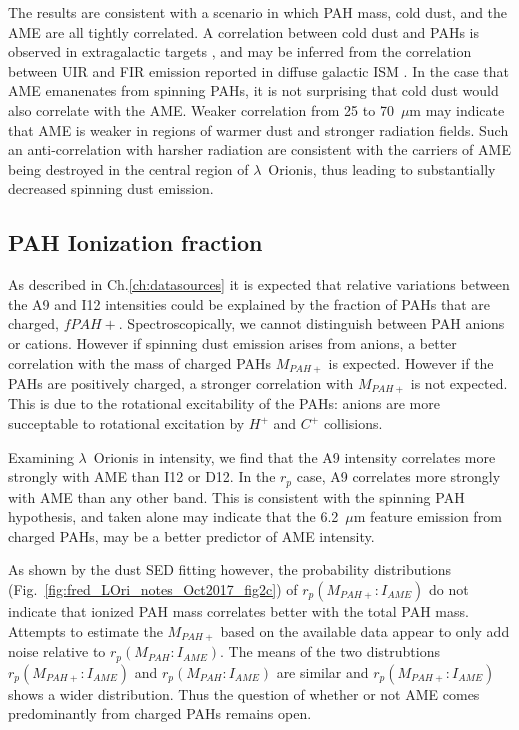         The results are consistent with a scenario in which PAH mass, cold dust, and the AME are all tightly correlated. A correlation between cold dust and PAHs is observed in extragalactic targets \citep{haas02}, and may be inferred from the correlation between UIR and FIR emission reported in diffuse galactic ISM \citep{onaka96}. In the case that AME emanenates from spinning PAHs, it is not surprising that cold dust would also correlate with the AME. Weaker correlation from 25 to 70~$\mu$m may indicate that AME is weaker in regions of warmer dust and stronger radiation fields. Such an anti-correlation with harsher radiation are consistent with the carriers of AME being destroyed in the central region of $\lambda$~Orionis, thus leading to substantially decreased spinning dust emission.

      \subsection{PAH Ionization fraction}
          As described in Ch.\ref{ch:datasources} it is expected that relative variations between the A9 and I12 intensities could be explained by the fraction of PAHs that are charged, $fPAH+$. Spectroscopically, we cannot distinguish between PAH anions or cations. However if spinning dust emission arises from anions, a better correlation with the mass of charged PAHs $M_{PAH+}$ is expected. However if the PAHs are positively charged, a stronger correlation with $M_{PAH+}$ is not expected. This is due to the rotational excitability of the PAHs: anions are more succeptable to rotational excitation by $H^{+}$ and $C^{+}$ collisions\citep{ali-haimoud10}.

          Examining $\lambda$~Orionis in intensity, we find that the A9 intensity correlates more strongly with AME than I12 or D12. In the $r_{p}$ case, A9 correlates more strongly with AME than any other band. This is consistent with the spinning PAH hypothesis, and taken alone may indicate that the 6.2~$\mu$m feature emission from charged PAHs, may be a better predictor of AME intensity.

          As shown by the dust SED fitting however, the probability distributions (Fig.~\ref{fig:fred_LOri_notes_Oct2017_fig2c}) of $r_{p}(M_{PAH+}:I_{AME})$ do not indicate that ionized PAH mass correlates better with the total PAH mass. Attempts to estimate the $M_{PAH+}$ based on the available data appear to only add noise relative to $r_{p}(M_{PAH}:I_{AME})$. The means of the two distrubtions $r_{p}(M_{PAH+}:I_{AME})$  and $r_{p}(M_{PAH}:I_{AME})$ are similar and $r_{p}(M_{PAH+}:I_{AME})$ shows a wider distribution. Thus the question of whether or not AME comes predominantly from charged PAHs remains open.

